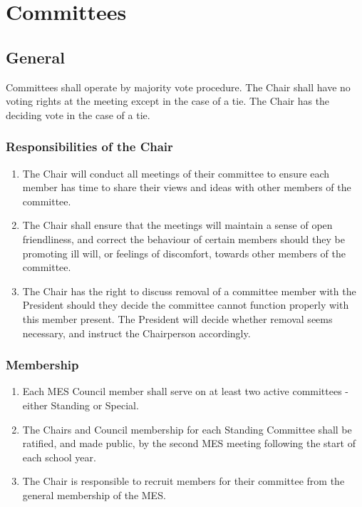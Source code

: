 \section{Committees}
\label{committees}

\subsection{General}
\label{committees-general}
Committees shall operate by majority vote procedure. The Chair shall
have no voting rights at the meeting except in the case of a tie. The
Chair has the deciding vote in the case of a tie.

\subsubsection{Responsibilities of the Chair}
\label{responsibilities-of-the-chair}

\begin{enumerate}
 \item
  The Chair will conduct all meetings of their committee to ensure each member has time to share their views and ideas with other members of the committee.
 \item
  The Chair shall ensure that the meetings will maintain a sense of open friendliness, and correct the behaviour of certain members should they be promoting ill will, or feelings of discomfort, towards other members of the committee.
 \item
  The Chair has the right to discuss removal of a committee member with the President should they decide the committee cannot function properly with this member present. The President will decide whether removal seems necessary, and instruct the Chairperson accordingly.
\end{enumerate}

\subsubsection{Membership}
\label{membership}
\begin{enumerate}
 \item
  Each MES Council member shall serve on at least two active committees - either Standing or Special.
 \item
  The Chairs and Council membership for each Standing Committee shall be ratified, and made public, by the second MES meeting following the start of each school year.
 \item
  The Chair is responsible to recruit members for their committee from the general membership of the MES.

\end{enumerate}


